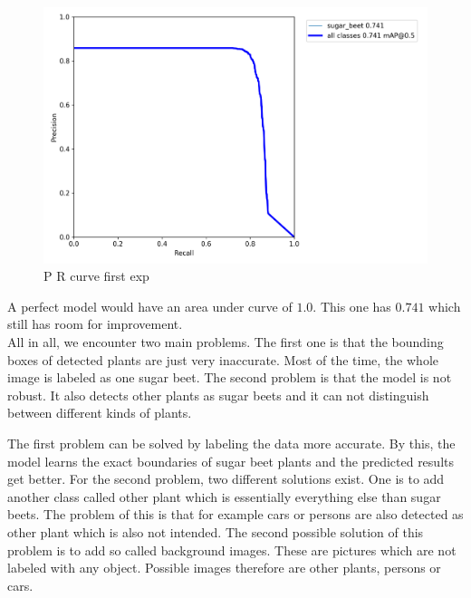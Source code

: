 \begin{figure}[htb!]
	\centering
	\includegraphics[scale=0.15]{figures/exp1_curve.png}
	\caption{P R curve first exp}
	\label{fig:exp1_curve}
\end{figure}

A perfect model would have an area under curve of $ 1.0 $. This one has $ 0.741 $ which still has room for improvement.\\


All in all, we encounter two main problems. The first one is that the bounding boxes of detected plants are just very inaccurate. Most of the time, the whole image is labeled as one sugar beet. The second problem is that the model is not robust. It also detects other plants as sugar beets and it can not distinguish between different kinds of plants.

The first problem can be solved by labeling the data more accurate. By this, the model learns the exact boundaries of sugar beet plants and the predicted results get better. For the second problem, two different solutions exist. One is to add another class called other plant which is essentially everything else than sugar beets. The problem of this is that for example cars or persons are also detected as other plant which is also not intended. The second possible solution of this problem is to add so called background images. These are pictures which are not labeled with any object. Possible images therefore are other plants, persons or cars. 


